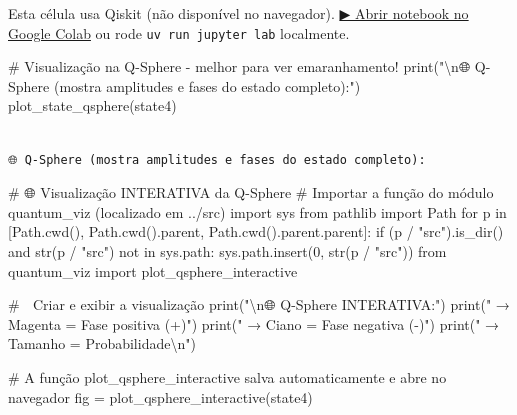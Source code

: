 \documentclass[
  brazilian,
]{report}
\newenvironment{Shaded}{\begin{snugshade}}{\end{snugshade}}
\newcommand{\BuiltInTok}[1]{\textcolor[rgb]{0.00,0.23,0.31}{#1}}
\newcommand{\CharTok}[1]{\textcolor[rgb]{0.13,0.47,0.30}{#1}}
\newcommand{\CommentTok}[1]{\textcolor[rgb]{0.37,0.37,0.37}{#1}}
\newcommand{\NormalTok}[1]{\textcolor[rgb]{0.00,0.23,0.31}{#1}}
\newcommand{\StringTok}[1]{\textcolor[rgb]{0.13,0.47,0.30}{#1}}
\begin{document}
\begin{tcolorbox}[enhanced jigsaw, arc=.35mm, bottomrule=.15mm, bottomtitle=1mm, breakable, colback=white, colbacktitle=quarto-callout-warning-color!10!white, colframe=quarto-callout-warning-color-frame, coltitle=black, left=2mm, leftrule=.75mm, opacityback=0, opacitybacktitle=0.6, rightrule=.15mm, title=\textcolor{quarto-callout-warning-color}{\faExclamationTriangle}\hspace{0.5em}{⚛️ Célula Qiskit --- execute no Colab ou localmente}, titlerule=0mm, toprule=.15mm, toptitle=1mm]

Esta célula usa Qiskit (não disponível no navegador).
\href{https://colab.research.google.com/github/maxwellamaral/aula-quantum/blob/main/notebooks/02-teletransport.ipynb}{▶
Abrir notebook no Google Colab} ou rode \texttt{uv\ run\ jupyter\ lab}
localmente.

\begin{Shaded}
\begin{Highlighting}[]


\CommentTok{\# Visualização na Q{-}Sphere {-} melhor para ver emaranhamento!}
\BuiltInTok{print}\NormalTok{(}\StringTok{"}\CharTok{\textbackslash{}n}\StringTok{🌐 Q{-}Sphere (mostra amplitudes e fases do estado completo):"}\NormalTok{)}
\NormalTok{plot\_state\_qsphere(state4)}
\end{Highlighting}
\end{Shaded}

\end{tcolorbox}

\begin{verbatim}

🌐 Q-Sphere (mostra amplitudes e fases do estado completo):
\end{verbatim}

\begin{Shaded}
\begin{Highlighting}[]

\NormalTok{\# 🌐 Visualização INTERATIVA da Q{-}Sphere}
\NormalTok{\# Importar a função do módulo quantum\_viz (localizado em ../src)}
\NormalTok{import sys}
\NormalTok{from pathlib import Path}
\NormalTok{for p in [Path.cwd(), Path.cwd().parent, Path.cwd().parent.parent]:}
\NormalTok{    if (p / "src").is\_dir() and str(p / "src") not in sys.path:}
\NormalTok{        sys.path.insert(0, str(p / "src"))}
\NormalTok{from quantum\_viz import plot\_qsphere\_interactive}

\NormalTok{\# 🎨 Criar e exibir a visualização}
\NormalTok{print("\textbackslash{}n🌐 Q{-}Sphere INTERATIVA:")}
\NormalTok{print("   → Magenta = Fase positiva (+)")}
\NormalTok{print("   → Ciano = Fase negativa ({-})")}
\NormalTok{print("   → Tamanho = Probabilidade\textbackslash{}n")}

\NormalTok{\# A função plot\_qsphere\_interactive salva automaticamente e abre no navegador}
\NormalTok{fig = plot\_qsphere\_interactive(state4)}
\end{Highlighting}
\end{Shaded}
\end{document}
